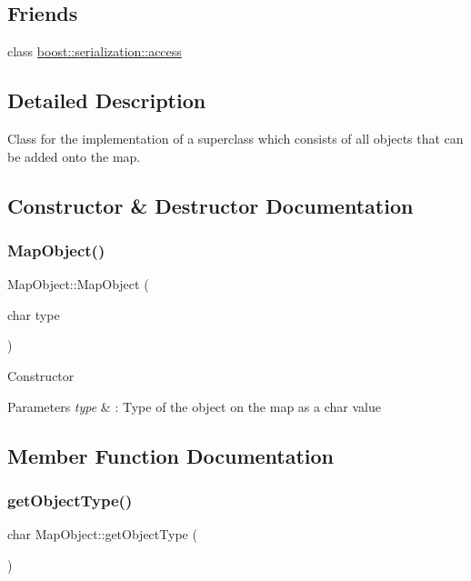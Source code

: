 \subsection*{Friends}
\begin{DoxyCompactItemize}
\item 
class \hyperlink{class_map_object_ac98d07dd8f7b70e16ccb9a01abf56b9c}{boost\+::serialization\+::access}
\end{DoxyCompactItemize}


\subsection{Detailed Description}
Class for the implementation of a superclass which consists of all objects that can be added onto the map. 

\subsection{Constructor \& Destructor Documentation}
\hypertarget{class_map_object_a6d1c6e3754501b52af5a79a3322f0fba}{}\label{class_map_object_a6d1c6e3754501b52af5a79a3322f0fba} 
\subsubsection{\texorpdfstring{Map\+Object()}{MapObject()}}
{\footnotesize\ttfamily Map\+Object\+::\+Map\+Object (\begin{DoxyParamCaption}\item[{char}]{type }\end{DoxyParamCaption})}

Constructor 
\begin{DoxyParams}{Parameters}
{\em type} & \+: Type of the object on the map as a char value \\
\hline
\end{DoxyParams}


\subsection{Member Function Documentation}
\hypertarget{class_map_object_af740b1d1e4c4bbdb8727eeadcea0d008}{}\label{class_map_object_af740b1d1e4c4bbdb8727eeadcea0d008} 
\subsubsection{\texorpdfstring{get\+Object\+Type()}{getObjectType()}}
{\footnotesize\ttfamily char Map\+Object\+::get\+Object\+Type (\begin{DoxyParamCaption}{ }\end{DoxyParamCaption})}

